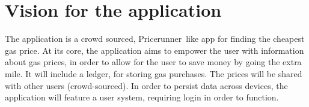 
\chapter{Vision for the application}
The application is a crowd sourced, Pricerunner\texttrademark\ like app for finding the cheapest gas price. At its core, the application aims to empower the user with information about gas prices, in order to allow for the user to save money by going the extra mile. It will include a ledger, for storing gas purchases. The prices will be shared with other users (crowd-sourced). In order to persist data across devices, the application will feature a user system, requiring login in order to function.
